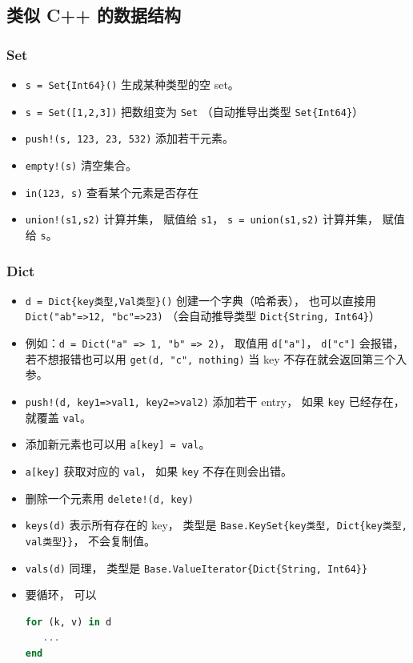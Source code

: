 \subsection{类似 C++ 的数据结构}
\subsubsection{Set}
\begin{itemize}
\item \verb`s = Set{Int64}()` 生成某种类型的空 set。
\item \verb`s = Set([1,2,3])` 把数组变为 \verb`Set` （自动推导出类型 \verb`Set{Int64}`）
\item \verb`push!(s, 123, 23, 532)` 添加若干元素。
\item \verb`empty!(s)` 清空集合。
\item \verb`in(123, s)` 查看某个元素是否存在
\item \verb`union!(s1,s2)` 计算并集， 赋值给 \verb`s1`， \verb`s = union(s1,s2)` 计算并集， 赋值给 \verb`s`。
\end{itemize}

\subsubsection{Dict}
\begin{itemize}
\item \verb`d = Dict{key类型,Val类型}()` 创建一个字典（哈希表）， 也可以直接用 \verb`Dict("ab"=>12, "bc"=>23)` （会自动推导类型 \verb`Dict{String, Int64}`）
\item 例如：\verb`d = Dict("a" => 1, "b" => 2)`， 取值用 \verb`d["a"]`， \verb`d["c"]` 会报错， 若不想报错也可以用 \verb`get(d, "c", nothing)` 当 key 不存在就会返回第三个入参。
\item \verb`push!(d, key1=>val1, key2=>val2)` 添加若干 entry， 如果 \verb`key` 已经存在， 就覆盖 \verb`val`。
\item 添加新元素也可以用 \verb`a[key] = val`。
\item \verb`a[key]` 获取对应的 \verb`val`， 如果 \verb`key` 不存在则会出错。
\item 删除一个元素用 \verb`delete!(d, key)`
\item \verb`keys(d)` 表示所有存在的 key， 类型是 \verb`Base.KeySet{key类型, Dict{key类型, val类型}}`， 不会复制值。
\item \verb`vals(d)` 同理， 类型是 \verb`Base.ValueIterator{Dict{String, Int64}}`
\item 要循环， 可以
\begin{lstlisting}[language=julia]
for (k, v) in d
   ...
end
\end{lstlisting}
\end{itemize}


